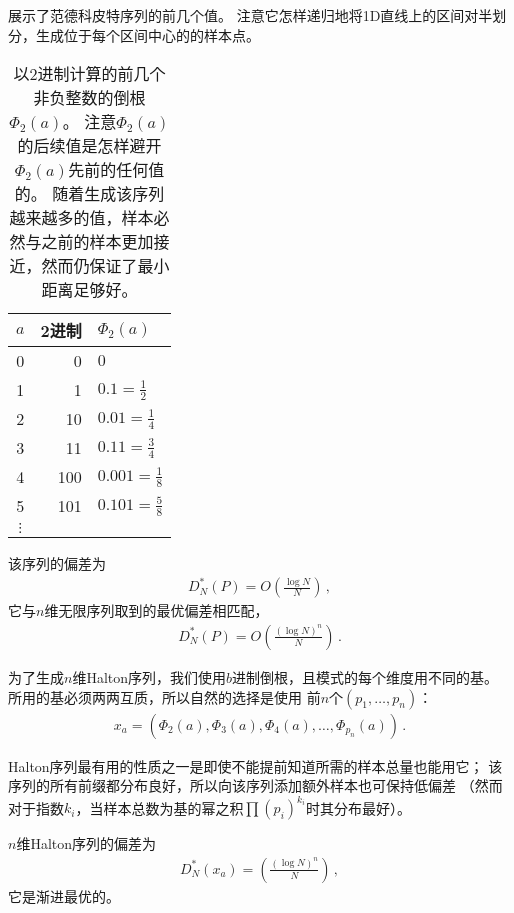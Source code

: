 展示了范德科皮特序列的前几个值。
注意它怎样递归地将1D直线上的区间对半划分，生成位于每个区间中心的的样本点。
\begin{table}[htbp]
    \centering
    \begin{tabular}{crl}
        \toprule
        $a$      & \textbf{2进制} & $\Phi_2(a)$         \\
        \midrule
        0        & 0              & $0$                 \\
        1        & 1              & $0.1=\frac{1}{2}$   \\
        2        & 10             & $0.01=\frac{1}{4}$  \\
        3        & 11             & $0.11=\frac{3}{4}$  \\
        4        & 100            & $0.001=\frac{1}{8}$ \\
        5        & 101            & $0.101=\frac{5}{8}$ \\
        $\vdots$ &                &                     \\
        \bottomrule
    \end{tabular}
    \caption{以2进制计算的前几个非负整数的倒根$\Phi_2(a)$。
        注意$\Phi_2(a)$的后续值是怎样避开$\Phi_2(a)$先前的任何值的。
        随着生成该序列越来越多的值，样本必然与之前的样本更加接近，然而仍保证了最小距离足够好。}
    \label{tab:7.3}
\end{table}

该序列的偏差为
\begin{align*}
    D^*_N(P)=O\left(\frac{\log N}{N}\right)\, ,
\end{align*}
它与$n$维无限序列取到的最优偏差相匹配，
\begin{align*}
    D^*_N(P)=O\left(\frac{(\log N)^n}{N}\right)\, .
\end{align*}

为了生成$n$维Halton序列，我们使用$b$进制倒根，且模式的每个维度用不同的基。
所用的基必须两两互质，所以自然的选择是使用
前$n$个$(p_1,\ldots,p_n)$：
\begin{align*}
    x_a=(\Phi_2(a),\Phi_3(a),\Phi_4(a),\ldots,\Phi_{p_n}(a))\, .
\end{align*}

Halton序列最有用的性质之一是即使不能提前知道所需的样本总量也能用它；
该序列的所有前缀都分布良好，所以向该序列添加额外样本也可保持低偏差
（然而对于指数$k_i$，当样本总数为基的幂之积$\prod(p_i)^{k_i}$时其分布最好）。

$n$维Halton序列的偏差为
\begin{align*}
    D^*_N(x_a)=\left(\frac{(\log N)^n}{N}\right)\, ,
\end{align*}
它是渐进最优的。

